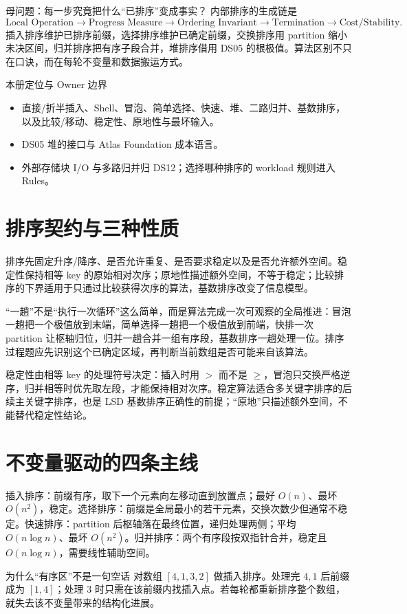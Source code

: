 \documentclass[UTF8,fontset=none,11pt,a4paper]{ctexart}
\begin{document}

\begin{corebox}{母问题：每一步究竟把什么“已排序”变成事实？}
内部排序的生成链是
\[
\text{Local Operation}\to\text{Progress Measure}\to\text{Ordering Invariant}\to\text{Termination}\to\text{Cost/Stability}.
\]
插入排序维护已排序前缀，选择排序维护已确定前缀，交换排序用 partition 缩小未决区间，归并排序把有序子段合并，堆排序借用 DS05 的根极值。算法区别不只在口诀，而在每轮不变量和数据搬运方式。
\end{corebox}
\begin{methodbox}{本册定位与 Owner 边界}
\begin{itemize}
\item {}直接/折半插入、Shell、冒泡、简单选择、快速、堆、二路归并、基数排序，以及比较/移动、稳定性、原地性与最坏输入。
\item {}DS05 堆的接口与 Atlas Foundation 成本语言。
\item {}外部存储块 I/O 与多路归并归 DS12；选择哪种排序的 workload 规则进入 Rules。
\end{itemize}
\end{methodbox}
\tableofcontents\newpage

\section{排序契约与三种性质}
排序先固定升序/降序、是否允许重复、是否要求稳定以及是否允许额外空间。稳定性保持相等 key 的原始相对次序；原地性描述额外空间，不等于稳定；比较排序的下界适用于只通过比较获得次序的算法，基数排序改变了信息模型。

“一趟”不是“执行一次循环”这么简单，而是算法完成一次可观察的全局推进：冒泡一趟把一个极值放到末端，简单选择一趟把一个极值放到前端，快排一次 partition 让枢轴归位，归并一趟合并一组有序段，基数排序一趟处理一位。排序过程题应先识别这个已确定区域，再判断当前数组是否可能来自该算法。

稳定性由相等 key 的处理符号决定：插入时用 $>$ 而不是 $\ge$，冒泡只交换严格逆序，归并相等时优先取左段，才能保持相对次序。稳定算法适合多关键字排序的后续主关键字排序，也是 LSD 基数排序正确性的前提；“原地”只描述额外空间，不能替代稳定性结论。

\section{不变量驱动的四条主线}
插入排序：前缀有序，取下一个元素向左移动直到放置点；最好 $O(n)$、最坏 $O(n^2)$，稳定。选择排序：前缀是全局最小的若干元素，交换次数少但通常不稳定。快速排序：partition 后枢轴落在最终位置，递归处理两侧；平均 $O(n\log n)$、最坏 $O(n^2)$。归并排序：两个有序段按双指针合并，稳定且 $O(n\log n)$，需要线性辅助空间。
\begin{examplebox}{为什么“有序区”不是一句空话}
对数组 $[4,1,3,2]$ 做插入排序。处理完 $4,1$ 后前缀成为 $[1,4]$；处理 $3$ 时只需在该前缀内找插入点。若每轮都重新排序整个数组，就失去该不变量带来的结构化进展。
\end{examplebox}
\end{document}
